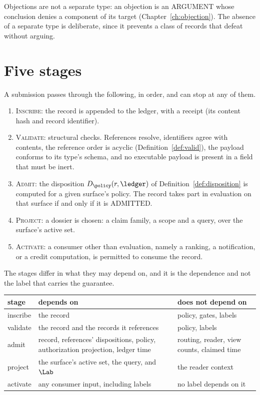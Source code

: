 Objections are not a separate type: an objection is an \textsf{ARGUMENT} whose conclusion denies a component of its target (Chapter~\ref{ch:objection}). The absence of a separate type is deliberate, since it prevents a class of records that defeat without arguing.

\section{Five stages}\label{sec:fivestages}

\begin{definition}[Stages]\label{def:stages}
A submission passes through the following, in order, and can stop at any of them.
\begin{enumerate}
\item \textsc{Inscribe}: the record is appended to the ledger, with a receipt (its content hash and record identifier).
\item \textsc{Validate}: structural checks. References resolve, identifiers agree with contents, the reference order is acyclic (Definition~\ref{def:valid}), the payload conforms to its type's schema, and no executable payload is present in a field that must be inert.
\item \textsc{Admit}: the disposition $D_\policy(r,\ledger)$ of Definition~\ref{def:disposition} is computed for a given surface's policy. The record takes part in evaluation on that surface if and only if it is $\mathrm{ADMITTED}$.
\item \textsc{Project}: a dossier is chosen: a claim family, a scope and a query, over the surface's active set.
\item \textsc{Activate}: a consumer other than evaluation, namely a ranking, a notification, or a credit computation, is permitted to consume the record.
\end{enumerate}
\end{definition}

The stages differ in what they may depend on, and it is the dependence and not the label that carries the guarantee.

\begin{center}
\small
\begin{tabularx}{\textwidth}{@{}l X X@{}}
\toprule
stage & depends on & does not depend on\\
\midrule
inscribe & the record & policy, gates, labels\\
validate & the record and the records it references & policy, labels\\
admit & record, references' dispositions, policy, authorization projection, ledger time & routing, reader, view counts, claimed time\\
project & the surface's active set, the query, and $\Lab$ & the reader context\\
activate & any consumer input, including labels & no label depends on it\\
\bottomrule
\end{tabularx}
\end{center}

